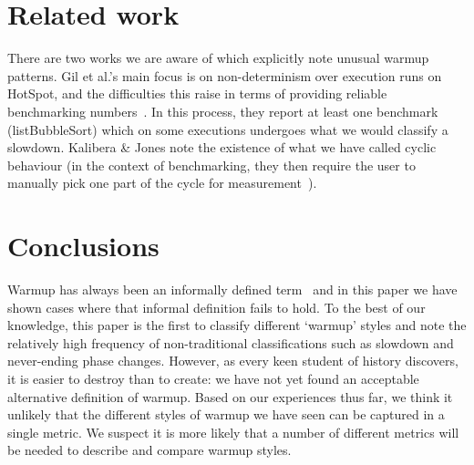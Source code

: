 \documentclass[a4paper,UKenglish]{lipics}
\newcommand{\kalibera}{Kalibera \& Jones\xspace}
\begin{document}
\section{Related work}

There are two works we are aware of which explicitly note unusual warmup
patterns. Gil et al.'s main focus is on non-determinism over execution runs on
HotSpot, and the difficulties this raise in terms of providing reliable
benchmarking numbers~\cite{gil11microbenchmark}. In this process, they report at
least one benchmark (listBubbleSort) which on some executions undergoes what we
would classify a slowdown. \kalibera note the
existence of what we have called cyclic behaviour (in the context of benchmarking,
they then require the user to
manually pick one part of the cycle for measurement~\cite{kalibera13rigorous}).


\section{Conclusions}
\label{sec:conclusion}

Warmup has always been an informally defined term~\cite{seaton15phd} and in this
paper we have shown cases where that informal definition fails to hold.
To the best of our knowledge, this paper is the first to classify different
`warmup' styles and note the relatively high frequency of non-traditional
classifications such as slowdown and never-ending phase changes.
However, as every keen student of history discovers, it is easier to destroy than to
create: we have not yet found an acceptable alternative definition of warmup.
Based on our experiences thus far, we think it unlikely that the different
styles of warmup we have seen can be captured in a single metric. We suspect it
is more likely that a number of different metrics will be needed to describe and
compare warmup styles.



\end{document}
